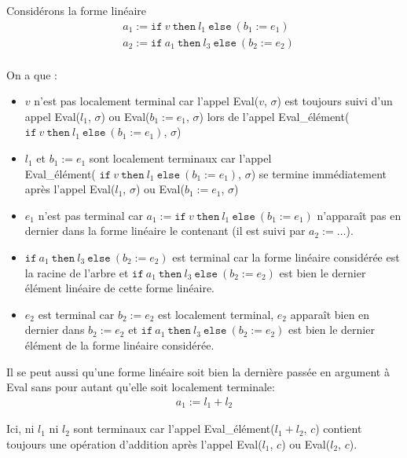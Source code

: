 \begin{example}
    Considérons la forme linéaire
    \begin{align*}
         & a_1 := \texttt{if}\ v\ \texttt{then}\ l_1\ \texttt{else}\ (b_1 := e_1)   \\
         & a_2 := \texttt{if}\ a_1\ \texttt{then}\ l_3\ \texttt{else}\ (b_2 := e_2) \\
    \end{align*}

    On a que :
    \begin{itemize}
        \item $v$ n'est pas localement terminal car l'appel Eval($v$, $\sigma$)
              est toujours suivi d'un appel Eval($l_1$, $\sigma$) ou
              Eval($b_1 := e_1$, $\sigma$) lors de l'appel Eval\_élément(
              $\texttt{if}\ v\ \texttt{then}\ l_1\ \texttt{else}\ (b_1 := e_1)$,
              $\sigma$)
        \item $l_1$ et $b_1 := e_1$ sont localement terminaux car l'appel \\
              Eval\_élément(
              $\texttt{if}\ v\ \texttt{then}\ l_1\ \texttt{else}\ (b_1 := e_1)$,
              $\sigma$) se termine immédiatement après l'appel
              Eval($l_1$, $\sigma$) ou Eval($b_1 := e_1$, $\sigma$)
        \item $e_1$ n'est pas terminal car
              $a_1 := \texttt{if}\ v\ \texttt{then}\ l_1\ \texttt{else}\ (b_1 := e_1)$
              n'apparaît pas en dernier dans la forme linéaire le contenant (il
              est suivi par $a_2 := \ldots$).
        \item $\texttt{if}\ a_1\ \texttt{then}\ l_3\ \texttt{else}\ (b_2 := e_2)$
              est terminal car la forme linéaire considérée est la racine de
              l'arbre et $\texttt{if}\ a_1\ \texttt{then}\ l_3\ \texttt{else}\ (b_2 := e_2)$
              est bien le dernier élément linéaire de cette forme linéaire.
        \item $e_2$ est terminal car $b_2 := e_2$ est localement terminal,
              $e_2$ apparaît bien en dernier dans $b_2 := e_2$ et
              $\texttt{if}\ a_1\ \texttt{then}\ l_3\ \texttt{else}\ (b_2 := e_2)$
              est bien le dernier élément de la forme linéaire considérée.
    \end{itemize}

    \medskip

    Il se peut aussi qu'une forme linéaire soit bien la dernière passée
    en argument à Eval sans pour autant qu'elle soit localement terminale:
    \begin{align*}
        a_1 := l_1 + l_2
    \end{align*}

    Ici, ni $l_1$ ni $l_2$ sont terminaux car l'appel
    Eval\_élément($l_1 + l_2$, $c$) contient toujours une opération
    d'addition après l'appel Eval($l_1$, $c$) ou Eval($l_2$, $c$).
\end{example}




